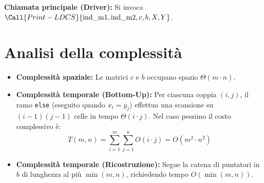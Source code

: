 \noindent
\textbf{Chiamata principale (Driver):} Si invoca $\Call{Print-LDCS}{\text{ind\_m1}, \text{ind\_m2}, c, b, X, Y}$.

\section{Analisi della complessità}
\begin{itemize}
    \item \textbf{Complessità spaziale:} Le matrici $c$ e $b$ occupano spazio $\Theta(m \cdot n)$.
    \item \textbf{Complessità temporale (Bottom-Up):} Per ciascuna coppia $(i, j)$, il ramo \texttt{else} (eseguito quando $x_i = y_j$) effettua una scansione su $(i-1)(j-1)$ celle in tempo $\Theta(i \cdot j)$. Nel caso pessimo il costo complessivo è:
    \[
        T(m, n) = \sum_{i=1}^{m} \sum_{j=1}^{n} O(i \cdot j) = O(m^2 \cdot n^2)
    \]
    \item \textbf{Complessità temporale (Ricostruzione):} Segue la catena di puntatori in $b$ di lunghezza al più $\min(m, n)$, richiedendo tempo $O(\min(m, n))$.
\end{itemize}